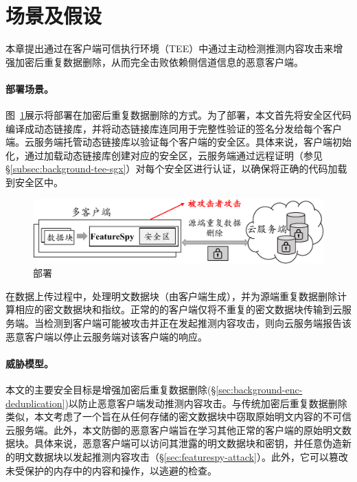 \section{场景及假设}
\label{sec:featurespy-setting}

本章提出\sysnameF 通过在客户端可信执行环境（TEE）中通过主动检测推测内容攻击来增强加密后重复数据删除，从而完全击败依赖侧信道信息的恶意客户端。

\paragraph*{部署场景。}图~\ref{fig:featurespy-model}展示将\sysnameF 部署在加密后重复数据删除的方式。为了部署\sysnameF，本文首先将安全区代码编译成动态链接库\cite{sgx}，并将动态链接库连同用于完整性验证的签名分发给每个客户端。云服务端托管动态链接库以验证每个客户端的安全区。具体来说，客户端初始化\sysnameF，通过加载动态链接库创建对应的安全区，云服务端通过远程证明\cite{sgx}（参见\S\ref{subsec:background-tee-sgx}）对每个安全区进行认证，以确保将正确的代码加载到安全区中。

\begin{figure}
    \centering
    \includegraphics[width=\textwidth]{pic/featurespy/deployment.pdf}
    \caption{部署\sysnameF}
    \label{fig:featurespy-model}
\end{figure}

在数据上传过程中，\sysnameF 处理明文数据块（由客户端生成），并为源端重复数据删除计算相应的密文数据块和指纹。正常的的客户端仅将不重复的密文数据块传输到云服务端。当\sysnameF 检测到客户端可能被攻击并正在发起推测内容攻击，则向云服务端报告该恶意客户端以停止云服务端对该客户端的响应。

\paragraph*{威胁模型。}本文的主要安全目标是增强加密后重复数据删除(\S\ref{sec:background-enc-deduplication})以防止恶意客户端发动推测内容攻击。与传统加密后重复数据删除\cite{bellare2013MLE}类似，本文考虑了一个旨在从任何存储的密文数据块中窃取原始明文内容的不可信云服务端。此外，本文防御的恶意客户端旨在学习其他正常的客户端的原始明文数据块。具体来说，恶意客户端可以访问其泄露的明文数据块和密钥，并任意伪造新的明文数据块以发起推测内容攻击（\S\ref{sec:featurespy-attack}）。此外，它可以篡改未受保护的内存中的内容和操作，以逃避\sysnameF 的检查。


